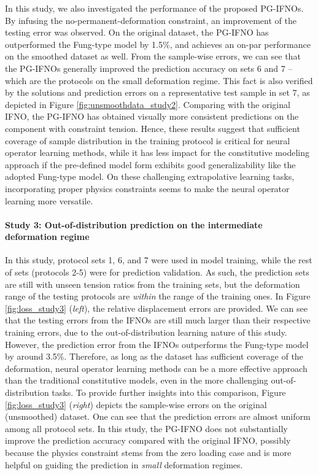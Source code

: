 \documentclass[twocolumn,10pt]{asme2ej}
\renewcommand{\~}{\tilde}
\renewcommand{\-}{\bar}
\newcommand{\8}{\infty}
\numberwithin{equation}{section}
\begin{document}
In this study, we also investigated the performance of the proposed PG-IFNOs. By infusing the no-permanent-deformation constraint, an improvement of the testing error was observed. On the original dataset, the PG-IFNO has outperformed the Fung-type model by 1.5\%, and achieves an on-par performance on the smoothed dataset as well. From the sample-wise errors, we can see that the PG-IFNOs generally improved the prediction accuracy on sets 6 and 7 -- which are the protocols on the small deformation regime. This fact is also verified by the solutions and prediction errors on a representative test sample in set 7, as depicted in Figure \ref{fig:unsmoothdata_study2}. Comparing with the original IFNO, the PG-IFNO has obtained visually more consistent predictions on the component with constraint tension. Hence, these results suggest that sufficient coverage of sample distribution in the training protocol is critical for neural operator learning methods, while it has less impact for the constitutive modeling approach if the pre-defined model form exhibits good generalizability like the adopted Fung-type model. On these challenging extrapolative learning tasks, incorporating proper physics constraints seems to make the neural operator learning more versatile.


\paragraph{Study 3: Out-of-distribution prediction on the intermediate deformation regime} In this study, protocol sets 1, 6, and 7 were used in model training, while the rest of sets (protocols 2-5) were for prediction validation. As such, the prediction sets are still with unseen tension ratios from the training sets, but the deformation range of the testing protocols are {\it within} the range of the training ones. In Figure \ref{fig:loss_study3} ({\it left}),  the relative displacement errors are provided. We can see that the testing errors from the IFNOs are still much larger than their respective training errors, due to the out-of-distribution learning nature of this study. However, the prediction error from the IFNOs outperforms the Fung-type model by around 3.5\%. Therefore, as long as the dataset has sufficient coverage of the deformation, neural operator learning methods can be a more effective approach than the traditional constitutive models, even in the more challenging out-of-distribution tasks. To provide further insights into this comparison, Figure \ref{fig:loss_study3} ({\it right}) depicts the sample-wise errors on the original (unsmoothed) dataset. One can see that the prediction errors are almost uniform among all protocol sets. In this study, the PG-IFNO does not substantially improve the prediction accuracy compared with the original IFNO, possibly because the physics constraint stems from the zero loading case and is more helpful on guiding the prediction in {\it small} deformation regimes.
\end{document}
